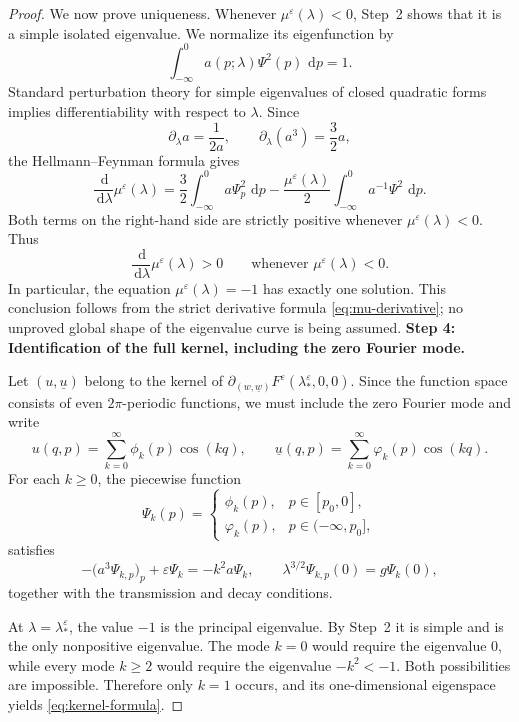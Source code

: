 \documentclass[10pt,a4paper]{amsart}
\newcommand{\dd}{\,\mathrm{d}}
\begin{document}
\begin{proof}
We now prove uniqueness.  Whenever $\mu^\varepsilon(\lambda)<0$, Step~2
shows that it is a simple isolated eigenvalue.  We normalize its
eigenfunction by
\[
\int_{-\infty}^{0}a(p;\lambda)\Psi^2(p)\,\dd p=1.
\]
Standard perturbation theory for simple eigenvalues of closed
quadratic forms implies differentiability with respect to $\lambda$.
Since
\[
\partial_\lambda a=\frac1{2a},
\qquad
\partial_\lambda(a^3)=\frac32a,
\]
the Hellmann--Feynman formula gives
\begin{equation}
\label{eq:mu-derivative}
\frac{\dd}{\dd\lambda}\mu^\varepsilon(\lambda)
=
\frac32
\int_{-\infty}^{0}a\Psi_p^2\,\dd p
-
\frac{\mu^\varepsilon(\lambda)}2
\int_{-\infty}^{0}a^{-1}\Psi^2\,\dd p.
\end{equation}
Both terms on the right-hand side are strictly positive whenever
$\mu^\varepsilon(\lambda)<0$.  Thus
\[
\frac{\dd}{\dd\lambda}\mu^\varepsilon(\lambda)>0
\qquad\text{whenever }\mu^\varepsilon(\lambda)<0.
\]
In particular, the equation
$\mu^\varepsilon(\lambda)=-1$ has exactly one solution.  This
conclusion follows from the strict derivative formula
\eqref{eq:mu-derivative}; no unproved global shape of the eigenvalue
curve is being assumed.
\medskip
\noindent
\textbf{Step 4: Identification of the full kernel, including the
zero Fourier mode.}

Let $(u,\underline u)$ belong to the kernel of
$\partial_{(w,\underline w)}F^\varepsilon(\lambda_*^\varepsilon,0,0)$.  Since the
function space consists of even $2\pi$-periodic functions, we must
include the zero Fourier mode and write
\[
u(q,p)=\sum_{k=0}^{\infty}\phi_k(p)\cos(kq),
\qquad
\underline u(q,p)
=
\sum_{k=0}^{\infty}\varphi_k(p)\cos(kq).
\]
For each $k\geq0$, the piecewise function
\[
\Psi_k(p)
=
\begin{cases}
\phi_k(p),&p\in[p_0,0],\\
\varphi_k(p),&p\in(-\infty,p_0],
\end{cases}
\]
satisfies
\begin{equation}
\label{eq:k-mode}
-\bigl(a^3\Psi_{k,p}\bigr)_p+\varepsilon\Psi_k
=
-k^2a\Psi_k,
\qquad
\lambda^{3/2}\Psi_{k,p}(0)=g\Psi_k(0),
\end{equation}
together with the transmission and decay conditions.

At $\lambda=\lambda_*^\varepsilon$, the value $-1$ is the principal
eigenvalue.  By Step~2 it is simple and is the only nonpositive
eigenvalue.  The mode $k=0$ would require the eigenvalue $0$, while
every mode $k\geq2$ would require the eigenvalue
$-k^2<-1$.  Both possibilities are impossible.  Therefore only
$k=1$ occurs, and its one-dimensional eigenspace yields
\eqref{eq:kernel-formula}.


\end{proof}
\end{document}
